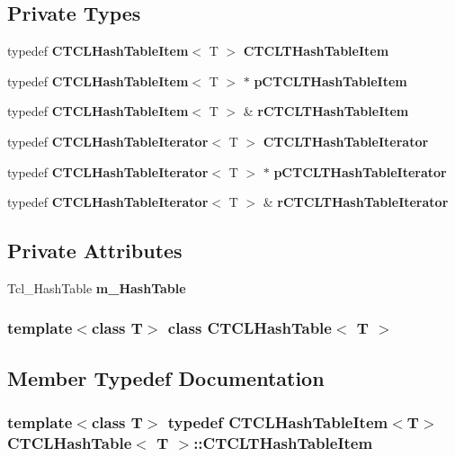 \subsection*{Private Types}
\begin{CompactItemize}
\item 
typedef {\bf CTCLHash\-Table\-Item}$<$ T $>$ {\bf CTCLTHash\-Table\-Item}
\item 
typedef {\bf CTCLHash\-Table\-Item}$<$ T $>$ $\ast$ {\bf p\-CTCLTHash\-Table\-Item}
\item 
typedef {\bf CTCLHash\-Table\-Item}$<$ T $>$ \& {\bf r\-CTCLTHash\-Table\-Item}
\item 
typedef {\bf CTCLHash\-Table\-Iterator}$<$ T $>$ {\bf CTCLTHash\-Table\-Iterator}
\item 
typedef {\bf CTCLHash\-Table\-Iterator}$<$ T $>$ $\ast$ {\bf p\-CTCLTHash\-Table\-Iterator}
\item 
typedef {\bf CTCLHash\-Table\-Iterator}$<$ T $>$ \& {\bf r\-CTCLTHash\-Table\-Iterator}
\end{CompactItemize}
\subsection*{Private Attributes}
\begin{CompactItemize}
\item 
Tcl\_\-Hash\-Table {\bf m\_\-Hash\-Table}
\end{CompactItemize}
\subsubsection*{template$<$class T$>$ class CTCLHash\-Table$<$ T $>$}



\subsection{Member Typedef Documentation}
\subsubsection{\setlength{\rightskip}{0pt plus 5cm}template$<$class T$>$ typedef {\bf CTCLHash\-Table\-Item}$<$T$>$ CTCLHash\-Table$<$ T $>$::CTCLTHash\-Table\-Item\hspace{0.3cm}{\tt  [private]}}\label{classCTCLHashTable_u0}




